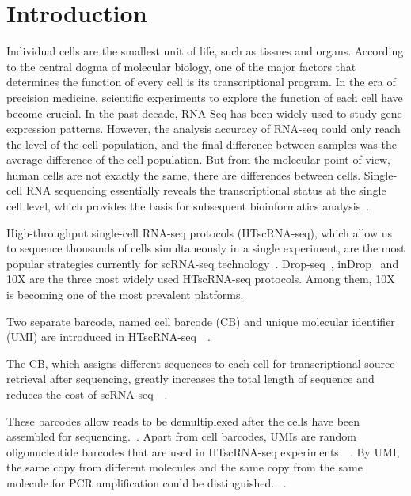 \documentclass[runningheads]{llncs}
\begin{document}
\section{Introduction}
Individual cells are the smallest unit of life, such as tissues and organs.
According to the central dogma of molecular biology, one of the major factors that determines the function of every cell is its transcriptional program.
In the era of precision medicine, scientific experiments to explore the function of each cell have become crucial.
In the past decade, RNA-Seq has been widely used to study gene expression patterns.
However, the analysis accuracy of RNA-seq could only reach the level of the cell population, and the final difference between samples was the average difference of the cell population. 
But from the molecular point of view, human cells are not exactly the same, there are differences between cells.
Single-cell RNA sequencing essentially reveals the transcriptional status at the single cell level, which provides the basis for subsequent bioinformatics analysis~\cite{Papalexi2018SinglecellRS}.

High-throughput single-cell RNA-seq protocols (HTscRNA-seq), which allow us to sequence thousands of cells simultaneously in a single experiment, are the most popular strategies currently for scRNA-seq technology~\cite{Zhang2019ComparativeAO}. Drop-seq~\cite{Macosko2015HighlyPG}, inDrop~\cite{Klein2015DropletBF} and 10X\cite{zheng2017Massivelypd} are the three most widely used HTscRNA-seq protocols.
Among them, 10X is becoming one of the most prevalent platforms.

Two separate barcode, named cell barcode (CB) and unique molecular identifier (UMI) are introduced in HTscRNA-seq~\cite{Rosenberg2018SinglecellPO}~\cite{Cao2017ComprehensiveSC}.

The CB, which assigns different sequences to each cell for transcriptional source retrieval after sequencing, greatly increases the total length of sequence and reduces the cost of scRNA-seq~\cite{Macosko2015HighlyPG}~\cite{Klein2015DropletBF}.

These barcodes allow reads to be demultiplexed after the cells have been assembled for sequencing.~\cite{tian2018scPipe}.
Apart from cell barcodes, UMIs are random oligonucleotide barcodes that are used in HTscRNA-seq experiments~\cite{Kivioja2012Counting}~\cite{camara2017Methods}.
By UMI, the same copy from different molecules and the same copy from the same molecule for PCR amplification could be distinguished. ~\cite{smith2017UMI}.
\end{document}
